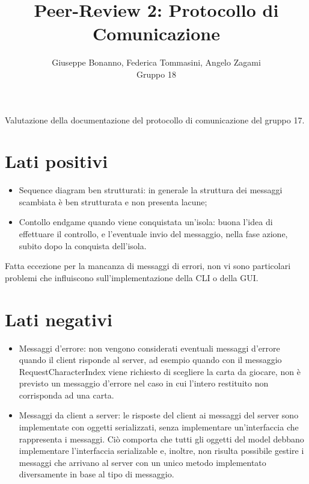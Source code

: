 \documentclass[12pt]{article}
\title{Peer-Review 2: Protocollo di Comunicazione}
\author{Giuseppe Bonanno, Federica Tommasini, Angelo Zagami\\Gruppo 18}
\begin{document}
\maketitle

Valutazione della documentazione del protocollo di comunicazione del gruppo 17.

\section{Lati positivi}

\begin{itemize}
    \item Sequence diagram ben strutturati: in generale la struttura dei messaggi scambiata è ben strutturata e non presenta lacune;
    \item Contollo endgame quando viene conquistata un'isola: buona l'idea di effettuare il controllo, e l'eventuale invio del messaggio, nella fase azione, subito dopo la conquista dell'isola.
    
\end{itemize}
Fatta eccezione per la mancanza di messaggi di errori, non vi sono particolari problemi che influiscono sull'implementazione della CLI o della GUI.
\section{Lati negativi}

\begin{itemize}
    \item Messaggi d'errore: non vengono considerati eventuali messaggi d'errore quando il client risponde al server, ad esempio quando con il messaggio RequestCharacterIndex viene richiesto di scegliere la carta da giocare, non è previsto un messaggio d'errore nel caso in cui l'intero restituito non corrisponda ad una carta.
    \item Messaggi da client a server: le risposte del client ai messaggi del server sono implementate con oggetti serializzati, senza implementare un'interfaccia che rappresenta i messaggi. Ciò comporta che tutti gli oggetti del model debbano implementare l'interfaccia serializable e, inoltre, non risulta possibile gestire i messaggi che arrivano al server con un unico metodo implementato diversamente in base al tipo di messaggio.
    
\end{itemize}
\end{document}
